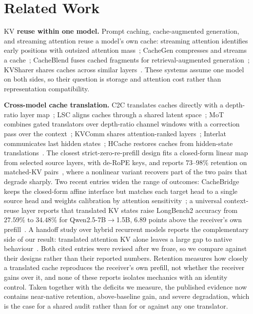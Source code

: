 \documentclass{article} %
\newcommand{\kv}{\ensuremath{\mathrm{KV}}}
\begin{document}

\section{Related Work}
\label{sec:survey}

\textbf{\kv{} reuse within one model.} Prompt caching, cache-augmented
generation, and streaming attention reuse a model's own cache: streaming
attention identifies early positions with outsized attention
mass~\citep{streamingsink2023}; CacheGen compresses and streams a
cache~\citep{cachegen2024}; CacheBlend fuses cached fragments for
retrieval-augmented generation~\citep{cacheblend2025}; KVSharer shares caches
across similar layers~\citep{kvsharer2024}. These systems assume one model on
both sides, so their question is storage and attention cost rather than
representation compatibility.

\textbf{Cross-model cache translation.} C2C translates caches directly with a
depth-ratio layer map~\citep{c2c2025}; LSC aligns caches through a shared latent
space~\citep{lsc2026}; MoT combines gated translators over depth-ratio channel
windows with a correction pass over the context~\citep{mot2026}; KVComm shares
attention-ranked layers~\citep{kvcomm2025}; Interlat communicates last hidden
states~\citep{interlat2025}; HCache restores caches from hidden-state
translations~\citep{hcache2025}. The closest strict-zero-re-prefill design fits
a closed-form linear map from selected source layers, with de-RoPE keys, and
reports $73$--$98\%$ retention on matched-\kv{} pairs~\citep{heo2026}, where a
nonlinear variant recovers part of the two pairs that degrade sharply.
Two recent entries widen the range of outcomes: CacheBridge keeps the
closed-form affine interface but matches each target head to a single source
head and weights calibration by attention sensitivity~\citep{cachebridge2026}; a
universal context-reuse layer reports that translated \kv{} states raise
LongBench2 accuracy from $27.59\%$ to $34.48\%$ for Qwen2.5-7B$\to$1.5B, $6.89$
points above the receiver's own prefill~\citep{contextreuse2026}. A handoff study
over hybrid recurrent models reports the complementary side of our result:
translated attention \kv{} alone leaves a large gap to native
behaviour~\citep{latentport2026}. Both cited entries were revised after we
froze, so we compare against their designs rather than their reported numbers.
Retention measures how closely a translated cache reproduces the receiver's own
prefill, not whether the receiver gains over it, and none of these reports
isolates mechanics with an identity control.
Taken together with the deficits we measure, the published evidence now
contains near-native retention, above-baseline gain, and severe degradation,
which is the case for a shared audit rather than for or against any one
translator.
\end{document}
